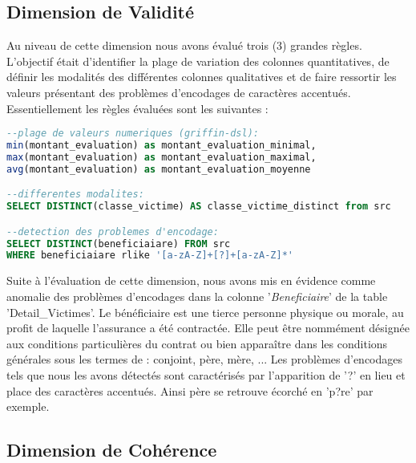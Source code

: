\subsection{Dimension de Validit\'e} 
Au niveau de cette dimension nous avons \'evalu\'e trois (3) grandes r\`egles. L'objectif \'etait d'identifier la plage de variation des colonnes quantitatives, de d\'efinir les modalit\'es des diff\'erentes colonnes qualitatives et de faire ressortir les valeurs pr\'esentant des probl\`emes d'encodages de caract\`eres accentu\'es. Essentiellement les r\`egles \'evalu\'ees sont les suivantes : 
\begin{lstlisting}[language=SQL,caption={R\`egles de la Dimension Validit\'e},captionpos=b,showspaces=false,basicstyle=\scriptsize,numbers=none,commentstyle=\color{gray},backgroundcolor=\color{background}]
--plage de valeurs numeriques (griffin-dsl): 
min(montant_evaluation) as montant_evaluation_minimal,
max(montant_evaluation) as montant_evaluation_maximal, 
avg(montant_evaluation) as montant_evaluation_moyenne

--differentes modalites:
SELECT DISTINCT(classe_victime) AS classe_victime_distinct from src

--detection des problemes d'encodage:
SELECT DISTINCT(beneficiaiare) FROM src 
WHERE beneficiaiare rlike '[a-zA-Z]+[?]+[a-zA-Z]*'
\end{lstlisting}
Suite \`a l'\'evaluation de cette dimension, nous avons mis en \'evidence comme anomalie des probl\`emes d'encodages dans la colonne '\textit{Beneficiaire}' de la table 'Detail\_Victimes'. Le b\'en\'eficiaire est une tierce personne physique ou morale, au profit de laquelle l'assurance a été contractée. Elle peut être nommément désignée aux conditions particulières du contrat ou bien apparaître dans les conditions générales sous les termes de : conjoint, p\`ere, m\`ere, ... Les probl\`emes d'encodages tels que nous les avons d\'etect\'es sont caract\'eris\'es par l'apparition de '?' en lieu et place des caract\`eres accentu\'es. Ainsi p\`ere se retrouve écorché en 'p?re' par exemple.



\subsection{Dimension de Coh\'erence }
